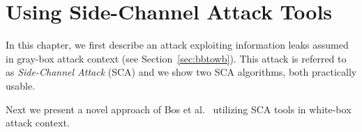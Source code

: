 \chapter{Using Side-Channel Attack Tools}
\label{chap:attack}

In this chapter, we first describe an attack exploiting information leaks assumed in gray-box attack context (see Section~\ref{sec:bbtowb}). This attack is referred to as {\em Side-Channel Attack} (SCA) and we show two SCA algorithms, both practically usable.

Next we present a novel approach of Bos et al.\ \cite{bos2015differential} utilizing SCA tools in white-box attack context.





